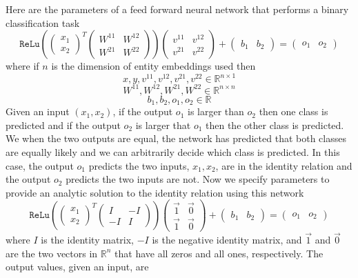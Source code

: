 \documentclass[12pt]{article}
\begin{document}
Here are the parameters of a feed forward neural network that performs a binary classification task
%
\[ \texttt{ReLu}(\begin{pmatrix} x_1 \\ x_2  \end{pmatrix}^T \begin{pmatrix} W^{11} & W^{12}\\ W^{21}& W^{22} \end{pmatrix}) \begin{pmatrix} v^{11} & v^{12} \\ v^{21} & v^{22} \end{pmatrix} + \begin{pmatrix}b_1 &b_2 \end{pmatrix}= \begin{pmatrix} o_1 & o_2\end{pmatrix}\]
%
where if $n$ is the dimension of entity embeddings used then
\[
  x, y,v^{11}, v^{12}, v^{21}, v^{22} \in \mathbb{R}^{n \times 1}
\]
\[
  W^{11}, W^{12},W^{21}, W^{22} \in \mathbb{R}^{n \times n}
\]
\[
  b_1, b_2, o_1, o_2 \in \mathbb{R}
\]
Given an input $(x_1,x_2)$, if the output $o_1$ is larger than $o_2$ then one class is predicted and if the output $o_2$ is larger that $o_1$ then the other class is predicted. We when the two outputs are equal, the network has predicted that both classes are equally likely and we can arbitrarily decide which class is predicted. In this case, the output $o_1$ predicts the two inputs, $x_1, x_2$, are in the identity relation and the output $o_2$ predicts the two inputs are not. Now we specify parameters to provide an analytic solution to the identity relation using this network
%
\[ \texttt{ReLu}(\begin{pmatrix} x_1 \\ x_2 \end{pmatrix}^T \begin{pmatrix} I & -I\\ -I& I \end{pmatrix}) \begin{pmatrix} \vec{1} & \vec{0} \\ \vec{1} & \vec{0} \end{pmatrix} + \begin{pmatrix}b_1 &b_2 \end{pmatrix}= \begin{pmatrix} o_1 & o_2\end{pmatrix}\]
%
where $I$ is the identity matrix, $-I$ is the negative identity matrix, and $\vec{1}$ and $\vec{0}$ are the two vectors in $\mathbb{R}^n$ that have all zeros and all ones, respectively. The output values, given an input, are
\end{document}
